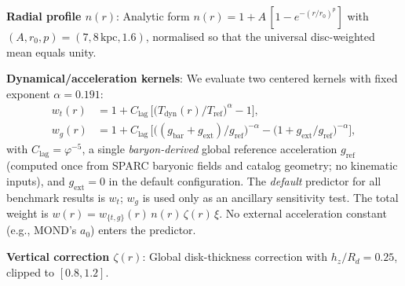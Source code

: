 \documentclass[usenatbib]{mnras}
\begin{document}
\textbf{Radial profile $n(r)$}: Analytic form $n(r) = 1 + A\,[1 - e^{-(r/r_0)^p}]$ with $(A, r_0, p) = (7, 8\,\mathrm{kpc}, 1.6)$, normalised so that the universal disc-weighted mean equals unity.

\textbf{Dynamical/acceleration kernels}: We evaluate two centered kernels with fixed exponent $\alpha = 0.191$:
\begin{align}
w_t(r) &= 1 + C_\mathrm{lag}\,\Big[\big(T_\mathrm{dyn}(r)/T_\mathrm{ref}\big)^{\alpha} - 1\Big],\\
w_g(r) &= 1 + C_\mathrm{lag}\,\Big[\big((g_\mathrm{bar}+g_\mathrm{ext})/g_\mathrm{ref}\big)^{-\alpha} - \big(1+g_\mathrm{ext}/g_\mathrm{ref}\big)^{-\alpha}\Big],
\end{align}
with $C_\mathrm{lag} = \varphi^{-5}$, a single \emph{baryon-derived} global reference acceleration $g_\mathrm{ref}$ (computed once from SPARC baryonic fields and catalog geometry; no kinematic inputs), and $g_\mathrm{ext}=0$ in the default configuration. The \emph{default} predictor for all benchmark results is $w_t$; $w_g$ is used only as an ancillary sensitivity test. The total weight is $w(r) = w_{\{t,g\}}(r)\, n(r)\,\zeta(r)\,\xi$. No external acceleration constant (e.g., MOND's $a_0$) enters the predictor.

\textbf{Vertical correction $\zeta(r)$}: Global disk-thickness correction with $h_z/R_d = 0.25$, clipped to $[0.8, 1.2]$.
\end{document}
